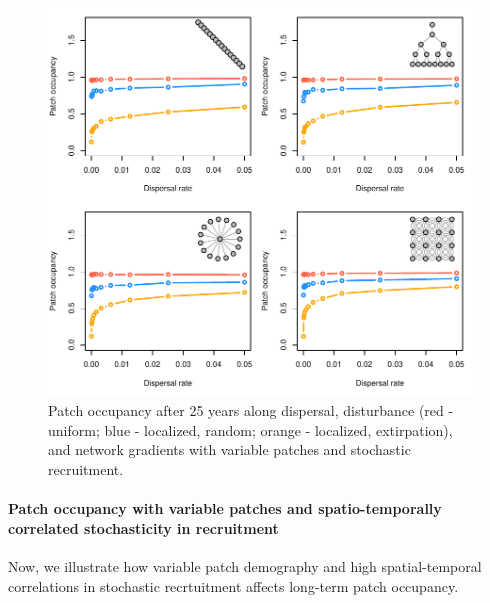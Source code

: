 \documentclass[
]{article}
\begin{document}
\begin{figure}[H]

{\centering \includegraphics{Managing_for_ecological_surprises_in_metapopulations_files/figure-latex/patch occupancy with variable patches and stochasticity-1} 

}

\caption{Patch occupancy after 25 years along dispersal, disturbance (red - uniform; blue - localized, random; orange - localized, extirpation), and network gradients with variable patches and stochastic recruitment.}\label{fig:patch occupancy with variable patches and stochasticity}
\end{figure}

\newpage

\hypertarget{patch-occupancy-with-variable-patches-and-spatio-temporally-correlated-stochasticity-in-recruitment}{%
\paragraph{Patch occupancy with variable patches and spatio-temporally
correlated stochasticity in
recruitment}\label{patch-occupancy-with-variable-patches-and-spatio-temporally-correlated-stochasticity-in-recruitment}}

Now, we illustrate how variable patch demography and high
spatial-temporal correlations in stochastic recrtuitment affects
long-term patch occupancy.
\end{document}
